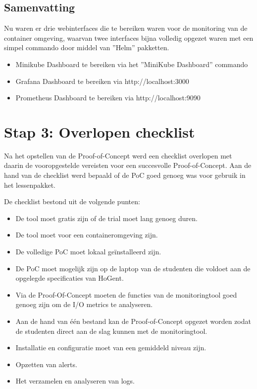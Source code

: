 \subsection{Samenvatting}

Nu waren er drie webinterfaces die te bereiken waren voor de monitoring van de container omgeving, waarvan twee interfaces bijna volledig opgezet waren met een simpel commando door middel van ''Helm'' pakketten. 

\begin{itemize}
    \item Minikube Dashboard te bereiken via het ''MiniKube Dashboard'' commando
    \item Grafana Dashboard te bereiken via http://localhost:3000
    \item Prometheus Dashboard te bereiken via http://localhost:9090
\end{itemize}\clearpage

\section{Stap 3: Overlopen checklist}

Na het opstellen van de Proof-of-Concept werd een checklist overlopen met daarin de vooropgestelde vereisten voor een succesvolle Proof-of-Concept. Aan de hand van de checklist werd bepaald of de PoC goed genoeg was voor gebruik in het lessenpakket.

De checklist bestond uit de volgende punten:

\begin{itemize}
    \item De tool moet gratis zijn of de trial moet lang genoeg duren. 
    \item De tool moet voor een containeromgeving zijn.
    \item De volledige PoC moet lokaal geïnstalleerd zijn.
    \item De PoC moet mogelijk zijn op de laptop van de studenten die voldoet aan de opgelegde specificaties van HoGent.
    \item Via de Proof-Of-Concept moeten de functies van de monitoringtool goed genoeg zijn om de I/O metrics te analyseren.
    \item Aan de hand van één bestand kan de Proof-of-Concept opgezet worden zodat de studenten direct aan de slag kunnen met de monitoringtool.
    \item Installatie en configuratie moet van een gemiddeld niveau zijn.
    \item Opzetten van alerts.
    \item Het verzamelen en analyseren van logs. 
\end{itemize}

